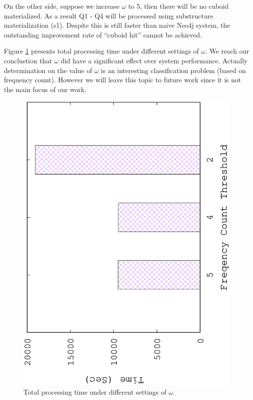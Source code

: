 On the other side, suppose we increase $\omega$ to 5, then there will be no cuboid materialized. As a result Q1 - Q4 will be processed using substructure materialization (s1). Despite this is still faster than naive Neo4j system, the outstanding improvement rate of ``cuboid hit'' cannot be achieved. 

Figure \ref{fig:omega} presents total processing time under different settings of $\omega$. We reach our conclustion that $\omega$ did have a significant effect over system performance. Actually determination on the value of $\omega$ is an interesting classification problem (based on frequency count). However we will leave this topic to future work since it is not the main focus of our work. 

\begin{figure}[H]
	\centering
	\includegraphics[scale=0.5, angle=270]{plot/omega}
	\caption{Total processing time under different settings of $\omega$.}
	\label{fig:omega}
\end{figure}


